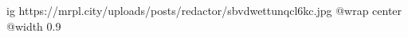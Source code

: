  
 
 
 
 

\ifcmt
  ig https://mrpl.city/uploads/posts/redactor/sbvdwettunqcl6kc.jpg
  @wrap center
  @width 0.9
\fi
